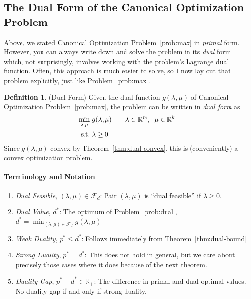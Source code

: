 \documentclass[12pt]{article}
\numberwithin{equation}{section} %
\theoremstyle{plain}
\theoremstyle{definition}
\newtheorem{defn}[thm]{Definition}
\theoremstyle{remark}
\newcommand{\R}{\mathbb{R}}
\begin{document}
\subsection{The Dual Form of the Canonical Optimization Problem}

Above, we stated Canonical Optimization Problem~\ref{prob:max} in
\emph{primal} form.
However, you can always write down and solve the problem in its
\emph{dual} form which, not surprisingly, involves working with the
problem's Lagrange dual function. Often, this approach is much easier to
solve, so I now lay out that problem explicitly, just like
Problem~\ref{prob:max}.

\begin{defn}(Dual Form)
Given the dual function $g(\lambda,\mu)$ of Canonical Optimization
Problem~\ref{prob:max}, the problem can be written in \emph{dual form}
as
\begin{align}
  \min_{\lambda,\mu} \; &g(\lambda,\mu)
  \qquad \lambda\in\R^m,\;\;\mu\in\R^k
  \label{prob:dual}
  \\
  \text{s.t.} \; &\lambda \geq 0\notag
\end{align}
Since $g(\lambda,\mu)$ convex by Theorem~\ref{thm:dual-convex}, this
is (conveniently) a convex optimization problem.

\paragraph{Terminology and Notation}
\begin{enumerate}
  \item \emph{Dual Feasible}, $(\lambda,\mu)\in\mathscr{F}_d$: Pair
    $(\lambda,\mu)$ is ``dual feasible'' if $\lambda\geq 0$.
  \item \emph{Dual Value}, $d^*$: The optimum of
    Problem~\ref{prob:dual}, $d^* = \min_{(\lambda,\mu)\in\mathscr{F}_d}
    g(\lambda,\mu)$
  \item \emph{Weak Duality}, $p^*\leq d^*$:
    Follows immediately from Theorem~\ref{thm:dual-bound}
  \item \emph{Strong Duality}, $p^*=d^*$: This does not hold in general,
    but we care about precisely those cases where it does because of the
    next theorem.
  \item \emph{Duality Gap}, $p^*-d^*\in\R_+$:
    The difference in primal and dual optimal values.
    No duality gap if and only if strong duality.
\end{enumerate}
\end{defn}
\end{document}
